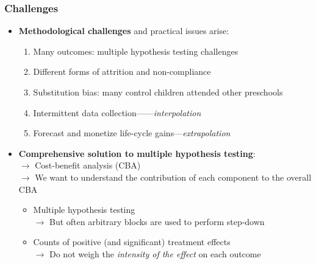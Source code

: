 \documentclass[static]{JJH-Beamer}
\begin{document}
\begin{frame}
	\frametitle{Challenges}
		\begin{itemize}
			\item \textbf{Methodological challenges} and practical issues arise:  
	\begin{enumerate}
		\item Many outcomes: multiple hypothesis testing challenges
		\item Different forms of attrition and non-compliance
		\item Substitution bias: many control children attended other preschools
		\item Intermittent data collection------\textit{interpolation}
		\item Forecast and monetize life-cycle gains---\textit{extrapolation}
	\end{enumerate}
			\item \textbf{Comprehensive solution to multiple hypothesis testing}: \\
				$\rightarrow$ Cost-benefit analysis (CBA) \\ 
				$\rightarrow$ We want to understand the contribution of each component to the overall CBA
				\begin{itemize}
					\item Multiple hypothesis testing \citep{Lehman_Romano_2005_AnnStat,Romano_Shaikh_2006_AnnStat} \\ $\rightarrow$ But often arbitrary blocks are used to perform step-down 
					\item Counts of positive (and significant) treatment effects \\
							$\rightarrow$ Do not weigh the \textit{intensity of the effect} on each outcome \\
				\end{itemize}
		\end{itemize}				
\end{frame}

\end{document}

